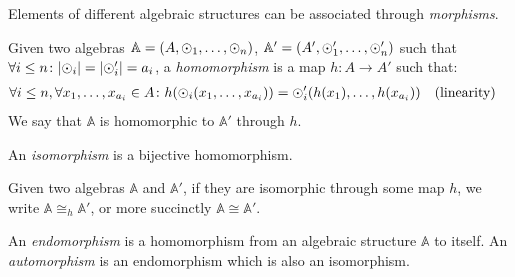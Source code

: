 Elements of different algebraic structures can be associated through \emph{morphisms}.
\begin{definition}[Homomorphism]
  Given two algebras \(\mathbb{A} = \left(A, \odot_{1}, \dots, \odot_{n}\right)\), 
  \(\mathbb{A}' = \left(A', \odot'_{1}, \dots, \odot'_{n}\right)\) such that 
  \(\forall i \le n\colon \abs{\odot_i} = \abs{\odot'_i} = a_i\), a \emph{homomorphism} is a map 
  \(h\colon A \to A'\) such that:
  \begin{align*}
    & \forall i \le n, \forall x_1,\dots, x_{a_{i}} \in A\colon 
    h(\odot_{i}(x_{1}, \dots, x_{a_{i}})) = \odot'_{i}(h(x_{1}), \dots, h(x_{a_{i}})) && 
    \textnormal{(linearity)}
  \end{align*}
  We say that \(\mathbb{A}\) is homomorphic to \(\mathbb{A}'\) through \(h\).
\end{definition}

\begin{definition}[Isomorphism]
  An \emph{isomorphism} is a bijective homomorphism.
\end{definition}

Given two algebras \(\mathbb{A}\) and \(\mathbb{A}'\), if they are isomorphic through some map
\(h\), we write \(\mathbb{A} \cong_h \mathbb{A}'\), or more succinctly \(\mathbb{A} \cong \mathbb{A}'\).

\begin{definition}
  An \emph{endomorphism} is a homomorphism from an algebraic structure \(\mathbb{A}\) to itself.
  An \emph{automorphism} is an endomorphism which is also an isomorphism.
\end{definition}


